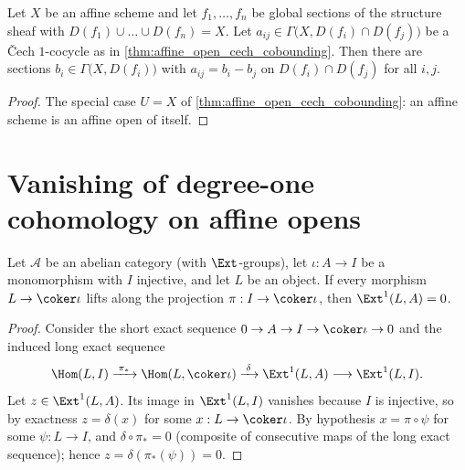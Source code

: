 \begin{theorem}
  \label{thm:cech_cobounding}
  \leanok
  Let \(X\) be an affine scheme and let \(f_1, \dots, f_n\) be global sections of the
  structure sheaf with \(D(f_1) \cup \dots \cup D(f_n) = X\). Let
  \(a_{ij} \in \Gamma\bigl(X, D(f_i) \cap D(f_j)\bigr)\) be a \v{C}ech \(1\)-cocycle as in
  \ref{thm:affine_open_cech_cobounding}. Then there are sections
  \(b_i \in \Gamma\bigl(X, D(f_i)\bigr)\) with \(a_{ij} = b_i - b_j\) on
  \(D(f_i) \cap D(f_j)\) for all \(i, j\).
\end{theorem}
\begin{proof}
  \leanok
  The special case \(U = X\) of \ref{thm:affine_open_cech_cobounding}: an affine scheme is
  an affine open of itself.
\end{proof}

\section{Vanishing of degree-one cohomology on affine opens}

\begin{lemma}
  \label{lem:ext_one_vanishing_criterion}
  \leanok
  Let \(\mathcal A\) be an abelian category (with \(\Ext\)-groups), let
  \(\iota : A \to I\) be a monomorphism with \(I\) injective, and let \(L\) be an object. If
  every morphism \(L \to \coker \iota\) lifts along the projection
  \(\pi : I \to \coker \iota\), then \(\Ext^1(L, A) = 0\).
\end{lemma}
\begin{proof}
  \leanok
  Consider the short exact sequence \(0 \to A \to I \to \coker \iota \to 0\) and the induced
  long exact sequence
  \[
    \Hom(L, I) \xrightarrow{\;\pi_*\;} \Hom(L, \coker \iota)
      \xrightarrow{\;\delta\;} \Ext^1(L, A) \longrightarrow \Ext^1(L, I).
  \]
  Let \(z \in \Ext^1(L, A)\). Its image in \(\Ext^1(L, I)\) vanishes because \(I\) is
  injective, so by exactness \(z = \delta(x)\) for some \(x : L \to \coker \iota\). By
  hypothesis \(x = \pi \circ \psi\) for some \(\psi : L \to I\), and
  \(\delta \circ \pi_* = 0\) (composite of consecutive maps of the long exact sequence);
  hence \(z = \delta(\pi_*(\psi)) = 0\).
\end{proof}

